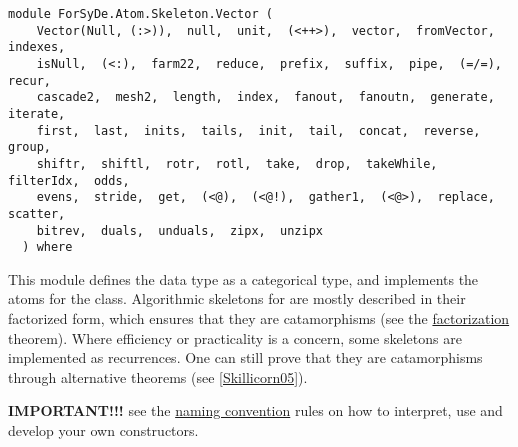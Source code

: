 \label{module:ForSyDe.Atom.Skeleton.Vector}
\haddockbeginheader
{\haddockverb\begin{verbatim}
module ForSyDe.Atom.Skeleton.Vector (
    Vector(Null, (:>)),  null,  unit,  (<++>),  vector,  fromVector,  indexes, 
    isNull,  (<:),  farm22,  reduce,  prefix,  suffix,  pipe,  (=/=),  recur, 
    cascade2,  mesh2,  length,  index,  fanout,  fanoutn,  generate,  iterate, 
    first,  last,  inits,  tails,  init,  tail,  concat,  reverse,  group, 
    shiftr,  shiftl,  rotr,  rotl,  take,  drop,  takeWhile,  filterIdx,  odds, 
    evens,  stride,  get,  (<@),  (<@!),  gather1,  (<@>),  replace,  scatter, 
    bitrev,  duals,  unduals,  zipx,  unzipx
  ) where\end{verbatim}}
\haddockendheader

This module defines the data type  as a categorical type,
 and implements the atoms for the 
 class. Algorithmic skeletons for  are mostly described in
 their factorized form, which ensures that they are catamorphisms
 (see the \href{ForSyDe-Atom-Skeleton.html#factorization}{factorization}
 theorem). Where efficiency or practicality is a concern, some
 skeletons are implemented as recurrences. One can still prove that
 they are catamorphisms through alternative theorems (see
 \href{ForSyDe-Atom.html#skillicorn05}{[Skillicorn05]}).\par
\textbf{IMPORTANT!!!}
 see the \href{ForSyDe-Atom.html#naming_conv}{naming convention} rules
 on how to interpret, use and develop your own constructors.\par

